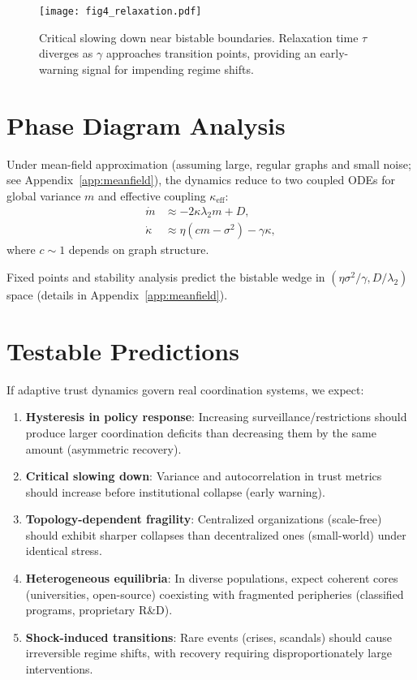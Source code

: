 \documentclass[12pt,a4paper]{article}
\begin{document}
\begin{figure}[H]
\centering
\texttt{[image: fig4\_relaxation.pdf]}
\caption{Critical slowing down near bistable boundaries. Relaxation time $\tau$ diverges as $\gamma$ approaches transition points, providing an early-warning signal for impending regime shifts.}
\label{fig:relaxation}
\end{figure}

\section{Phase Diagram Analysis}

Under mean-field approximation (assuming large, regular graphs and small noise; see Appendix~\ref{app:meanfield}), the dynamics reduce to two coupled ODEs for global variance $m$ and effective coupling $\kappa_{\text{eff}}$:
\begin{align}
\dot{m} &\approx -2 \kappa \lambda_2 m + D, \\
\dot{\kappa} &\approx \eta (c m - \sigma^2) - \gamma \kappa,
\end{align}
where $c \sim 1$ depends on graph structure.

Fixed points and stability analysis predict the bistable wedge in $(\eta\sigma^2/\gamma, D/\lambda_2)$ space (details in Appendix~\ref{app:meanfield}).

\section{Testable Predictions}
\label{sec:predictions}

If adaptive trust dynamics govern real coordination systems, we expect:

\begin{enumerate}
\item \textbf{Hysteresis in policy response}: Increasing surveillance/restrictions should produce larger coordination deficits than decreasing them by the same amount (asymmetric recovery).
\item \textbf{Critical slowing down}: Variance and autocorrelation in trust metrics should increase before institutional collapse (early warning).
\item \textbf{Topology-dependent fragility}: Centralized organizations (scale-free) should exhibit sharper collapses than decentralized ones (small-world) under identical stress.
\item \textbf{Heterogeneous equilibria}: In diverse populations, expect coherent cores (universities, open-source) coexisting with fragmented peripheries (classified programs, proprietary R\&D).
\item \textbf{Shock-induced transitions}: Rare events (crises, scandals) should cause irreversible regime shifts, with recovery requiring disproportionately large interventions.
\end{enumerate}
\end{document}
